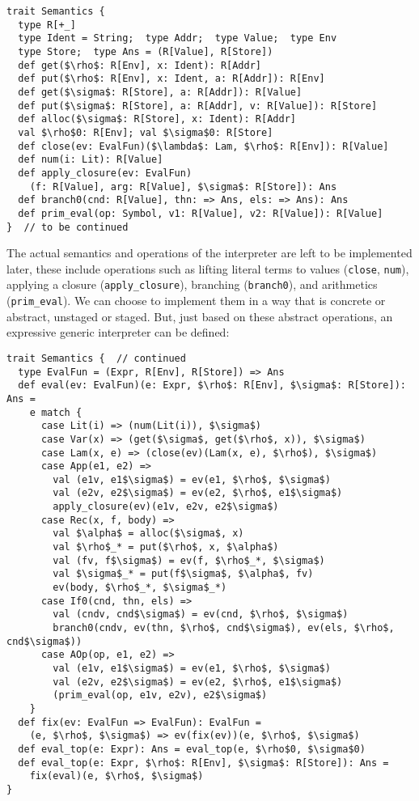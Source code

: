 \begin{lstlisting}
trait Semantics {
  type R[+_]
  type Ident = String;  type Addr;  type Value;  type Env
  type Store;  type Ans = (R[Value], R[Store])
  def get($\rho$: R[Env], x: Ident): R[Addr]
  def put($\rho$: R[Env], x: Ident, a: R[Addr]): R[Env]
  def get($\sigma$: R[Store], a: R[Addr]): R[Value]
  def put($\sigma$: R[Store], a: R[Addr], v: R[Value]): R[Store]
  def alloc($\sigma$: R[Store], x: Ident): R[Addr]
  val $\rho$0: R[Env]; val $\sigma$0: R[Store]
  def close(ev: EvalFun)($\lambda$: Lam, $\rho$: R[Env]): R[Value]
  def num(i: Lit): R[Value]
  def apply_closure(ev: EvalFun)
    (f: R[Value], arg: R[Value], $\sigma$: R[Store]): Ans
  def branch0(cnd: R[Value], thn: => Ans, els: => Ans): Ans
  def prim_eval(op: Symbol, v1: R[Value], v2: R[Value]): R[Value]
}  // to be continued
\end{lstlisting}

The actual semantics and operations of the interpreter are left to be
implemented later, these include operations such as lifting literal terms to
values (\texttt{close}, \texttt{num}), applying a closure
(\texttt{apply\_closure}), branching (\texttt{branch0}), and arithmetics
(\texttt{prim\_eval}). We can choose to implement them in a way that is concrete
or abstract, unstaged or staged. But, just based on these abstract operations,
an expressive generic interpreter can be defined:

\begin{lstlisting}
trait Semantics {  // continued
  type EvalFun = (Expr, R[Env], R[Store]) => Ans
  def eval(ev: EvalFun)(e: Expr, $\rho$: R[Env], $\sigma$: R[Store]): Ans = 
    e match {
      case Lit(i) => (num(Lit(i)), $\sigma$)
      case Var(x) => (get($\sigma$, get($\rho$, x)), $\sigma$)
      case Lam(x, e) => (close(ev)(Lam(x, e), $\rho$), $\sigma$)
      case App(e1, e2) =>
        val (e1v, e1$\sigma$) = ev(e1, $\rho$, $\sigma$)
        val (e2v, e2$\sigma$) = ev(e2, $\rho$, e1$\sigma$)
        apply_closure(ev)(e1v, e2v, e2$\sigma$)
      case Rec(x, f, body) =>
        val $\alpha$ = alloc($\sigma$, x)
        val $\rho$_* = put($\rho$, x, $\alpha$)
        val (fv, f$\sigma$) = ev(f, $\rho$_*, $\sigma$)
        val $\sigma$_* = put(f$\sigma$, $\alpha$, fv)
        ev(body, $\rho$_*, $\sigma$_*)
      case If0(cnd, thn, els) =>
        val (cndv, cnd$\sigma$) = ev(cnd, $\rho$, $\sigma$)
        branch0(cndv, ev(thn, $\rho$, cnd$\sigma$), ev(els, $\rho$, cnd$\sigma$))
      case AOp(op, e1, e2) =>
        val (e1v, e1$\sigma$) = ev(e1, $\rho$, $\sigma$)
        val (e2v, e2$\sigma$) = ev(e2, $\rho$, e1$\sigma$)
        (prim_eval(op, e1v, e2v), e2$\sigma$)
    }
  def fix(ev: EvalFun => EvalFun): EvalFun = 
    (e, $\rho$, $\sigma$) => ev(fix(ev))(e, $\rho$, $\sigma$)
  def eval_top(e: Expr): Ans = eval_top(e, $\rho$0, $\sigma$0)
  def eval_top(e: Expr, $\rho$: R[Env], $\sigma$: R[Store]): Ans = 
    fix(eval)(e, $\rho$, $\sigma$)
}
\end{lstlisting}

